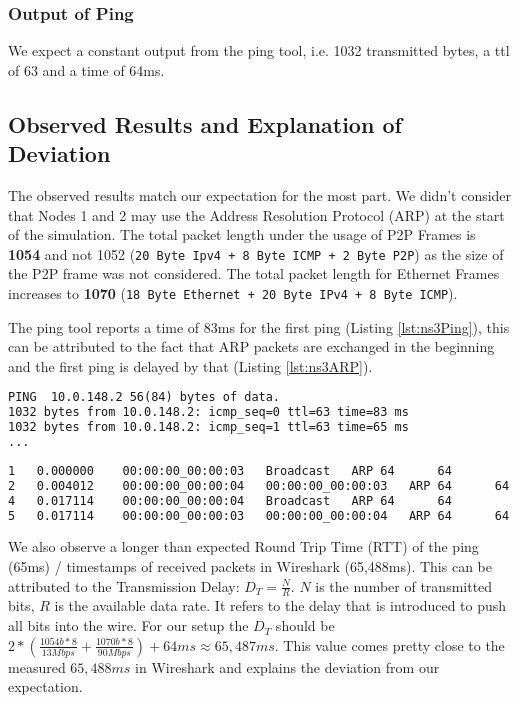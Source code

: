 \documentclass[parskip=full]{scrartcl}
\begin{document}
\subsubsection{Output of Ping}
We expect a constant output from the ping tool, i.e. 1032 transmitted bytes, a ttl of 63 and a time of 64ms.

\subsection{Observed Results and Explanation of Deviation}
The observed results match our expectation for the most part. 
We didn't consider that Nodes 1 and 2 may use the Address Resolution Protocol (ARP) at the start of the simulation.
The total packet length under the usage of P2P Frames is \textbf{1054} and not 1052 (\texttt{20 Byte Ipv4 + 8 Byte ICMP + 2 Byte P2P}) as the size of the P2P frame was not considered.
The total packet length for Ethernet Frames increases to \textbf{1070} (\texttt{18 Byte Ethernet + 20 Byte IPv4 + 8 Byte ICMP}).

The ping tool reports a time of 83ms for the first ping (Listing \ref{lst:ns3Ping}), this can be attributed to the fact that ARP packets are exchanged in the beginning and the first ping is delayed by that (Listing \ref{lst:ns3ARP}). 
\begin{lstlisting}[language=tex, breaklines, frame=single, caption={Ping output from the ns3 simulation}, label=lst:ns3Ping, float, floatplacement=h]
PING  10.0.148.2 56(84) bytes of data.
1032 bytes from 10.0.148.2: icmp_seq=0 ttl=63 time=83 ms
1032 bytes from 10.0.148.2: icmp_seq=1 ttl=63 time=65 ms
...
\end{lstlisting}

\begin{lstlisting}[language=tex, breaklines, frame=single, caption={ARP messages that delay the first ping}, label=lst:ns3ARP, float, floatplacement=h]
1	0.000000	00:00:00_00:00:03	Broadcast	ARP	64		64					
2	0.004012	00:00:00_00:00:04	00:00:00_00:00:03	ARP	64		64									
4	0.017114	00:00:00_00:00:04	Broadcast	ARP	64		64									
5	0.017114	00:00:00_00:00:03	00:00:00_00:00:04	ARP	64		64									
\end{lstlisting}

We also observe a longer than expected Round Trip Time (RTT) of the ping (65ms) / timestamps of received packets in Wireshark (65,488ms).
This can be attributed to the Transmission Delay: $D_T = \frac{N}{R}$.
$N$ is the number of transmitted bits, $R$ is the available data rate.
It refers to the delay that is introduced to push all bits into the wire.
For our setup the $D_T$ should be $2*(\frac{1054b*8}{13Mbps} + \frac{1070b*8}{90Mbps})+64ms \approx 65,487ms$.
This value comes pretty close to the measured $65,488ms$ in Wireshark and explains the deviation from our expectation.


\end{document}

